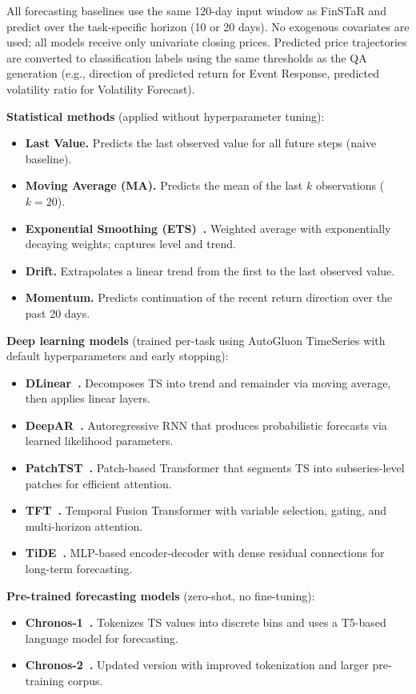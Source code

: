 All forecasting baselines use the same 120-day input window as FinSTaR and predict over the task-specific horizon (10 or 20 days).
No exogenous covariates are used; all models receive only univariate closing prices.
Predicted price trajectories are converted to classification labels using the same thresholds as the QA generation (e.g., direction of predicted return for Event Response, predicted volatility ratio for Volatility Forecast).

\textbf{Statistical methods} (applied without hyperparameter tuning):
\begin{itemize}
\item \textbf{Last Value.} Predicts the last observed value for all future steps (naive baseline).
\item \textbf{Moving Average (MA).} Predicts the mean of the last $k$ observations ($k{=}20$).
\item \textbf{Exponential Smoothing (ETS)~\cite{ets}.} Weighted average with exponentially decaying weights; captures level and trend.
\item \textbf{Drift.} Extrapolates a linear trend from the first to the last observed value.
\item \textbf{Momentum.} Predicts continuation of the recent return direction over the past 20 days.
\end{itemize}

\textbf{Deep learning models} (trained per-task using AutoGluon TimeSeries with default hyperparameters and early stopping):
\begin{itemize}
\item \textbf{DLinear~\cite{dlinear}.} Decomposes TS into trend and remainder via moving average, then applies linear layers.
\item \textbf{DeepAR~\cite{deepar}.} Autoregressive RNN that produces probabilistic forecasts via learned likelihood parameters.
\item \textbf{PatchTST~\cite{patchtst}.} Patch-based Transformer that segments TS into subseries-level patches for efficient attention.
\item \textbf{TFT~\cite{tft}.} Temporal Fusion Transformer with variable selection, gating, and multi-horizon attention.
\item \textbf{TiDE~\cite{tide}.} MLP-based encoder-decoder with dense residual connections for long-term forecasting.
\end{itemize}

\textbf{Pre-trained forecasting models} (zero-shot, no fine-tuning):
\begin{itemize}
\item \textbf{Chronos-1~\cite{chronos2024}.} Tokenizes TS values into discrete bins and uses a T5-based language model for forecasting.
\item \textbf{Chronos-2~\cite{chronos2024}.} Updated version with improved tokenization and larger pre-training corpus.
\end{itemize}

